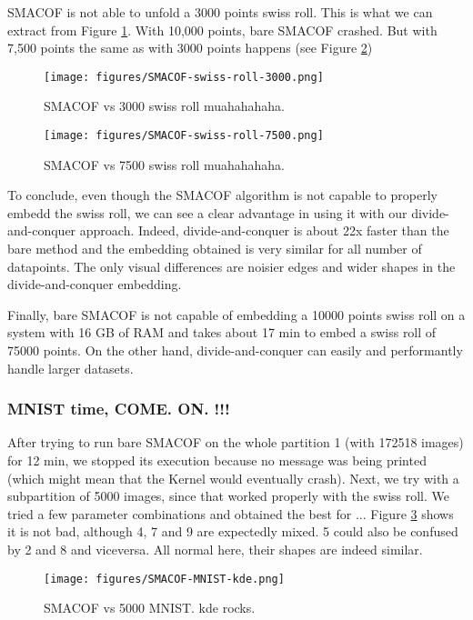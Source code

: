 SMACOF is not able to unfold a 3000 points swiss roll. This is what we can extract from Figure \ref{fig:SMACOF-swiss-roll-3000}. With 10,000 points, bare SMACOF crashed. But with 7,500 points the same as with 3000 points happens (see Figure \ref{fig:SMACOF-swiss-roll-7500})

\begin{figure}[ht]
    \centering
    \texttt{[image: figures/SMACOF-swiss-roll-3000.png]}
    \caption{SMACOF vs 3000 swiss roll muahahahaha.}
    \label{fig:SMACOF-swiss-roll-3000}
\end{figure}

\begin{figure}[ht]
    \centering
    \texttt{[image: figures/SMACOF-swiss-roll-7500.png]}
    \caption{SMACOF vs 7500 swiss roll muahahahaha.}
    \label{fig:SMACOF-swiss-roll-7500}
\end{figure}

To conclude, even though the SMACOF algorithm is not capable to properly embedd the swiss roll, we can see a clear advantage in using it with our divide-and-conquer approach. Indeed, divide-and-conquer is about 22x faster than the bare method and the embedding obtained is very similar for all number of datapoints. The only visual differences are noisier edges and wider shapes in the divide-and-conquer embedding.

Finally, bare SMACOF is not capable of embedding a 10000 points swiss roll on a system with 16 GB of RAM and takes about 17 min to embed a swiss roll of 75000 points. On the other hand, divide-and-conquer can easily and performantly handle larger datasets.

\subsubsection{MNIST time, COME. ON. !!!}

After trying to run bare SMACOF on the whole partition 1 (with 172518 images) for 12 min, we stopped its execution because no message was being printed (which might mean that the Kernel would eventually crash). Next, we try with a subpartition of 5000 images, since that worked properly with the swiss roll. We tried a few parameter combinations and obtained the best for ... Figure \ref{fig:SMACOF-MNIST-kde} shows it is not bad, although 4, 7 and 9 are expectedly mixed. 5 could also be confused by 2 and 8 and viceversa. All normal here, their shapes are indeed similar.

\begin{figure}[ht]
    \centering
    \texttt{[image: figures/SMACOF-MNIST-kde.png]}
    \caption{SMACOF vs 5000 MNIST. kde rocks.}
    \label{fig:SMACOF-MNIST-kde}
\end{figure}

